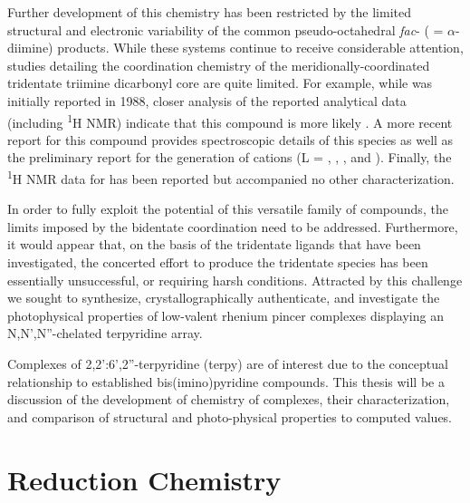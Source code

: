 Further development of this chemistry has been restricted by the limited structural and electronic variability of the common pseudo-octahedral \textit{fac}-\ce{[L2ReX(CO)3]} ( = $\alpha$-diimine) products. While these systems continue to receive considerable attention, studies detailing the coordination chemistry of the meridionally-coordinated tridentate triimine  dicarbonyl core are quite limited\autocite{jurca2013}. For example, while  was initially reported in 1988\autocite{juris1988}, closer analysis of the reported analytical data (including \textsuperscript{1}H NMR) indicate that this compound is more likely . A more recent report for this compound provides spectroscopic details of this species as well as the preliminary report for the generation of  cations (L = , , , and )\autocite{black2012}. Finally, the \textsuperscript{1}H NMR data for  has been reported\autocite{abel1993} but accompanied no other characterization.

In order to fully exploit the potential of this versatile family of compounds, the limits imposed by the bidentate coordination need to be addressed. Furthermore, it would appear that, on the basis of the tridentate ligands that have been investigated, the concerted effort to produce the tridentate species has been essentially unsuccessful, or requiring harsh conditions\autocite{potgieter2013}. Attracted by this challenge we sought to synthesize, crystallographically authenticate, and investigate the photophysical properties of low-valent rhenium pincer complexes displaying an N,N',N''-chelated terpyridine array. 

Complexes of 2,2':6',2''-terpyridine (terpy) are of interest due to the conceptual relationship to established bis(imino)pyridine compounds\autocite{russell2010, tondreau2012}. This thesis will be a discussion of the development of chemistry of  complexes, their characterization, and comparison of structural and photo-physical properties to computed values. 

\section{ Reduction Chemistry}

